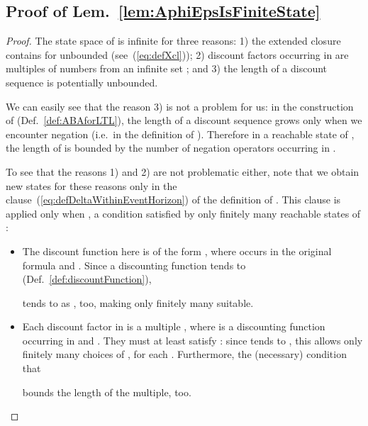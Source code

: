 \documentclass[a4paper,USenglish,numberwithinsect]{lipics}
\theoremstyle{definition}
\theoremstyle{remark}
\theoremstyle{plain}
\begin{document}
\subsection{Proof of Lem.~\ref{lem:AphiEpsIsFiniteState}}
\label{pf:lemAphiEpsIsFiniteState}
\begin{proof}
 The state space  of
  is infinite for three reasons: 1) 
 the extended closure
 contains 
 for unbounded   (see~(\ref{eq:defXcl})); 2)  discount factors 
 occurring in  are multiples of numbers from an infinite set 
 ; and 3) the length of a discount sequence
  is potentially unbounded. 

 We can easily see that the reason 3) is not a problem for us: in the construction of 
 (Def.~\ref{def:ABAforLTL}), the length of
 a discount sequence  grows only when we encounter negation
(i.e.\ in the definition of ). 
Therefore in a reachable state  of , the
 length of  is bounded by the number of negation operators
 occurring in .

 To see that the reasons 1) and 2) are not problematic either, note that
 we obtain new states for these reasons only in the
 clause~(\ref{eq:defDeltaWithinEventHorizon}) of the definition of . This clause is applied only when 
 	 , a
 condition satisfied by
 only finitely many reachable states of :
\begin{itemize}
 \item The discount function  here is of the form
       ,
       where  occurs in the original formula  and . Since a discounting function  tends to 
       (Def.~\ref{def:discountFunction}),
       
       tends to  as , too, making only finitely many 
       suitable.
 \item Each discount factor  in  is a multiple
       , where
        is a discounting function occurring in  and
       . They must at least satisfy
       : since  tends to , this allows only finitely many
       choices of , for each . Furthermore, the
       (necessary) condition that 
       
       bounds the length  of the multiple, too.   
\end{itemize}
\end{proof}
\end{document}
